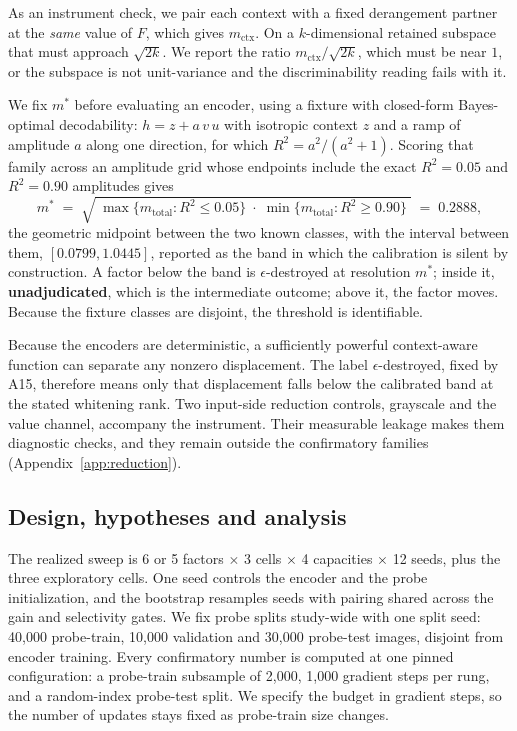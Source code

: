 \documentclass[10pt]{article}
\begin{document}
As an instrument check, we pair each context with a fixed derangement partner at the \emph{same}
value of $F$, which gives $m_{\mathrm{ctx}}$. On a $k$-dimensional retained subspace that must
approach $\sqrt{2k}$. We report the ratio $m_{\mathrm{ctx}}/\sqrt{2k}$, which must be near $1$, or
the subspace is not unit-variance and the discriminability reading fails with it.

We fix $m^{*}$ before evaluating an encoder, using a fixture with closed-form Bayes-optimal
decodability: $h = z + a\,v\,u$ with isotropic
context $z$ and a ramp of amplitude $a$ along one direction, for which $R^2 = a^2/(a^2+1)$. Scoring
that family across an amplitude grid whose endpoints include the exact $R^2 = 0.05$ and $R^2 = 0.90$
amplitudes gives
\begin{equation}
m^{*} \;=\; \sqrt{\;\max\{m_{\mathrm{total}} : R^2 \le 0.05\}\;\cdot\;\min\{m_{\mathrm{total}} : R^2
\ge 0.90\}\;}
\;=\; 0.2888,
\label{eq:mstar}
\end{equation}
the geometric midpoint between the two known classes, with the interval between them, $[0.0799,
1.0445]$, reported as the band in which the calibration is silent by construction. A factor below
the band is $\epsilon$-destroyed at resolution $m^{*}$; inside it, \textbf{unadjudicated}, which is
the intermediate outcome; above it, the factor moves. Because the fixture classes are disjoint, the
threshold is identifiable.

Because the encoders are deterministic, a sufficiently powerful context-aware function can separate
any nonzero displacement. The label $\epsilon$-destroyed, fixed by A15, therefore means only that
displacement falls below the calibrated band at the stated whitening rank. Two
input-side reduction controls, grayscale and the value channel, accompany the instrument. Their
measurable leakage makes them diagnostic checks, and they remain outside the confirmatory families
(Appendix~\ref{app:reduction}).

\subsection{Design, hypotheses and analysis}
\label{sec:design}
The realized sweep is 6 or 5 factors $\times$ 3 cells $\times$ 4 capacities $\times$ 12 seeds, plus
the three exploratory cells. One seed controls the encoder and the probe initialization, and the
bootstrap resamples seeds with pairing shared across the gain and selectivity gates. We fix probe
splits study-wide with one split seed: 40{,}000 probe-train, 10{,}000 validation and 30{,}000
probe-test images, disjoint from encoder training. Every confirmatory number is computed at one
pinned configuration: a probe-train subsample of 2{,}000, 1{,}000 gradient steps per rung, and a
random-index probe-test split. We specify the budget in gradient steps, so the number of updates stays fixed as probe-train size
changes.
\end{document}
